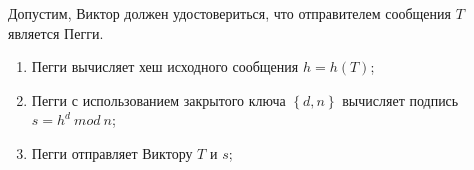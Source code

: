 Допустим, Виктор должен удостовериться, что отправителем сообщения $T$ является Пегги.

\begin{enumerate}

\item Пегги вычисляет хеш исходного сообщения $h = h(T)$;
\item Пегги с использованием закрытого ключа $\left\{d,n\right\}$ вычисляет подпись $s = h^d \ mod \ n$;
\item Пегги отправляет Виктору $T$ и $s$;

\end{enumerate}
